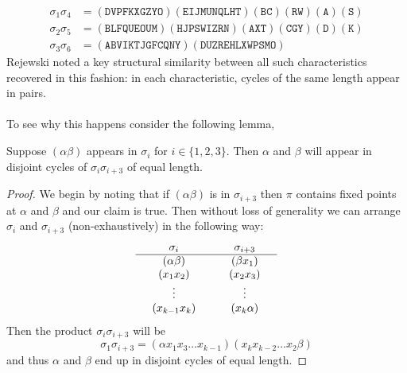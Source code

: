 \begin{align*}
	\sigma_1\sigma_4 & = (\texttt{DVPFKXGZYO})(\texttt{EIJMUNQLHT})(\texttt{BC})(\texttt{RW})(\texttt{A})(\texttt{S}) \\
	\sigma_2\sigma_5 & = (\texttt{BLFQUEOUM})(\texttt{HJPSWIZRN})(\texttt{AXT})(\texttt{CGY})(\texttt{D})(\texttt{K}) \\
	\sigma_3\sigma_6 & = (\texttt{ABVIKTJGFCQNY})(\texttt{DUZREHLXWPSMO})
\end{align*}
Rejewski noted a key structural similarity between all such characteristics recovered in this fashion: in each characteristic, cycles of the same length appear in pairs.
\\\\To see why this happens consider the following lemma,
\begin{lemma}
	\label{cillies}
	Suppose $(\alpha\beta)$ appears in $\sigma_i$ for $i\in\{1,2,3\}$. Then $\alpha$ and $\beta$ will appear in disjoint cycles of $\sigma_i\sigma_{i+3}$ of equal length.
\end{lemma}
\begin{proof}
	We begin by noting that if $(\alpha\beta)$ is in $\sigma_{i+3}$ then $\pi$ contains fixed points at $\alpha$ and $\beta$ and our claim is true. Then without loss of generality we can arrange $\sigma_{i}$ and $\sigma_{i+3}$ (non-exhaustively) in the following way:
	\[
		\setlength{\arraycolsep}{15pt}
		\begin{array}{cc}
			\sigma_i      & \sigma_{i+3} \\
			\hline
			(\alpha\beta) & (\beta x_1)  \\
			(x_1 x_2)     & (x_2 x_3)    \\
			\vdots        & \vdots       \\
			(x_{k-1} x_k) & (x_k \alpha)
		\end{array}
	\]
	Then the product $\sigma_i\sigma_{i+3}$ will be
	\[
		\sigma_1\sigma_{i+3} = (\alpha x_1 x_3 \dots x_{k-1} )(x_k x_{k-2} \dots x_2 \beta)
	\]
	and thus $\alpha$ and $\beta$ end up in disjoint cycles of equal length.
\end{proof}

